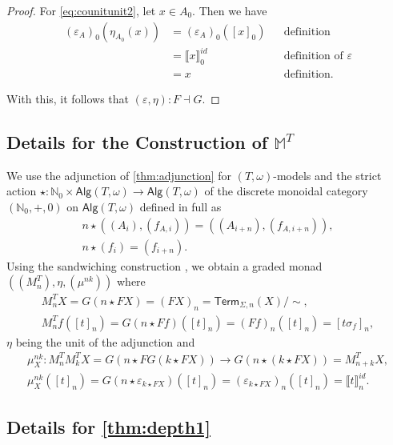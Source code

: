 \documentclass[11pt,a4paper]{amsart}
\newcommand{\Alg}{\mathsf{Alg}}
\newcommand{\Term}{\mathsf{Term}}
\newcommand{\sig}{\Sigma}
\theoremstyle{plain}
\newcommand{\id}{\mathit{id}}
\numberwithin{equation}{section}
\newcommand{\Nat}{{\mathbb{N}}}
\newcommand{\monad}{{\mathbb{M}}}
\newcommand{\+}[1]{\mathcal{#1}\xspace}
\theoremstyle{definition}
\begin{document}
\begin{proof}
    For \eqref{eq:counitunit2}, let \(x \in A_0\).
    Then we have
    \begin{align*}
        (\varepsilon_A)_0(\eta_{A_0}(x))
        &= (\varepsilon_A)_0([x]_0) && \text{definition} \\
        &= \llbracket x \rrbracket^{\id}_0 && \text{definition of } \varepsilon \\
        &= x && \text{definition}.
    \end{align*}

    With this, it follows that \((\varepsilon, \eta)\colon F \dashv G\).
\end{proof}

\subsection{Details for the Construction of $\monad^T$}\label{def:inducedmonad}

We use the adjunction of \cref{thm:adjunction} for
$(T,\omega)$-models and the strict action
\(\star\colon \Nat_0 \times \Alg(T, \omega) \to \Alg(T, \omega)\) of
the discrete monoidal category \((\Nat_0, +, 0)\) on
\(\Alg(T, \omega)\) defined in full as
\begin{gather*}
  n \star ((A_i), (f_{A, i})) = ((A_{i + n}), (f_{A, i + n})), \\
  n \star (f_i) = (f_{i + n}).
\end{gather*}
Using the sandwiching construction {\cite[Section 3]{FujiiEA16}}, we
obtain a graded monad \(((M^T_n), \eta, (\mu^{nk}))\) where
\begin{gather*}
  M^T_nX = G(n \star FX) = (FX)_n = \Term_{\sig, n}(X)/{\sim}, \\
  M_n^Tf([t]_n) = G(n \star Ff)([t]_n) = (Ff)_n([t]_n) = [t\sigma_f]_n,
\end{gather*}
\(\eta\) being the unit of the adjunction and
\begin{gather*}
  \mu^{nk}_X\colon M_n^TM_k^TX = G(n \star FG(k \star FX)) \to G(n \star (k \star FX)) = M^T_{n + k}X, \\
  \mu^{nk}_X([t]_n) = G(n \star \varepsilon_{k \star FX})([t]_n) = (\varepsilon_{k \star FX})_n([t]_n) = \llbracket t \rrbracket^{\id}_n.
\end{gather*}

\subsection*{Details for \cref{thm:depth1}}
\end{document}
